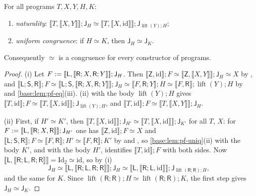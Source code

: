 \begin{lemma}
\label{base:lem:pf-iter}
For all programs $T,X,Y,H,K$:
\begin{enumerate}[label=\textup{(\roman*)}]
\item \emph{naturality}:
 $\llbracket T,\llbracket X,Y\rrbracket\rrbracket;\mathsf J_H\simeq
 \llbracket T,\llbracket X,\mathrm{id}\rrbracket\rrbracket;
 \mathsf J_{\operatorname{lift}(Y);H}$;
\item \emph{uniform congruence}: if $H\simeq K$, then
 $\mathsf J_H\simeq\mathsf J_K$.
\end{enumerate}
Consequently $\simeq$ is a congruence for every constructor of programs.
\end{lemma}

\begin{proof}
(i) Let
$F\mathrel{:=}[\![\mathsf L,[\![\mathsf R;X,\mathsf R;Y]\!]]\!];
\mathsf J_H$.  Then $\llbracket\mathsf Z,\mathrm{id}\rrbracket;F\simeq
\llbracket\mathsf Z,\llbracket X,Y\rrbracket\rrbracket;\mathsf J_H\simeq X$
by , and
$\llbracket\mathsf L;\mathsf S,\mathsf R\rrbracket;F\simeq
\llbracket\mathsf L;\mathsf S,\llbracket\mathsf R;X,\mathsf R;Y\rrbracket\rrbracket;
\mathsf J_H\simeq\llbracket F,\mathsf R;Y\rrbracket;H\simeq
\llbracket F,\mathsf R\rrbracket;\operatorname{lift}(Y);H$ by 
and \cref{base:lem:pf-eq}(iii).  (ii) with the body
$\operatorname{lift}(Y);H$ gives
$\llbracket T,\mathrm{id}\rrbracket;F\simeq
\llbracket T,\llbracket X,\mathrm{id}\rrbracket\rrbracket;
\mathsf J_{\operatorname{lift}(Y);H}$, and
$\llbracket T,\mathrm{id}\rrbracket;F\simeq
\llbracket T,\llbracket X,Y\rrbracket\rrbracket;\mathsf J_H$.

(ii) First, if $H'\simeq K'$, then
$\llbracket T,\llbracket X,\mathrm{id}\rrbracket\rrbracket;\mathsf J_{H'}\simeq
\llbracket T,\llbracket X,\mathrm{id}\rrbracket\rrbracket;\mathsf J_{K'}$
for all $T$, $X$: for
$F\mathrel{:=}[\![\mathsf L,[\![\mathsf R;X,\mathsf R]\!]]\!];
\mathsf J_{H'}$ one has $\llbracket\mathsf Z,\mathrm{id}\rrbracket;F\simeq X$
and $\llbracket\mathsf L;\mathsf S,\mathsf R\rrbracket;F\simeq
\llbracket F,\mathsf R\rrbracket;H'\simeq\llbracket F,\mathsf R\rrbracket;K'$
by  and , so \cref{base:lem:pf-uniq}(ii) with the
body $K'$, and with the body $H'$, identifies
$\llbracket T,\mathrm{id}\rrbracket;F$ with both sides.  Now
$\llbracket\mathsf L,\llbracket\mathsf R;\mathsf L,\mathsf R;\mathsf R\rrbracket\rrbracket
=\mathrm{Id}_2\simeq\mathrm{id}$, so by (i)
\[
 \mathsf J_H\simeq\llbracket\mathsf L,\llbracket\mathsf R;\mathsf L,
 \mathsf R;\mathsf R\rrbracket\rrbracket;\mathsf J_H\simeq
 \llbracket\mathsf L,\llbracket\mathsf R;\mathsf L,\mathrm{id}\rrbracket\rrbracket;
 \mathsf J_{\operatorname{lift}(\mathsf R;\mathsf R);H},
\]
and the same for $K$.  Since
$\operatorname{lift}(\mathsf R;\mathsf R);H\simeq
\operatorname{lift}(\mathsf R;\mathsf R);K$, the first step gives
$\mathsf J_H\simeq\mathsf J_K$.
\end{proof}

